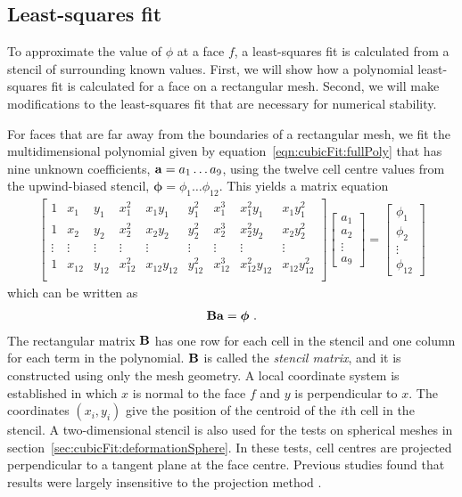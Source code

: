 \subsection{Least-squares fit}
To approximate the value of $\phi$ at a face $f$, a least-squares fit is calculated from a stencil of surrounding known values.  First, we will show how a polynomial least-squares fit is calculated for a face on a rectangular mesh.  Second, we will make modifications to the least-squares fit that are necessary for numerical stability.  

For faces that are far away from the boundaries of a rectangular mesh, we fit the multidimensional polynomial given by equation~\eqref{eqn:cubicFit:fullPoly} that has nine unknown coefficients, $\mathbf{a} = a_1 \ldots a_9$, using the twelve cell centre values from the upwind-biased stencil, $\bm{\phi} = \phi_1 \ldots \phi_{12}$.  This yields a matrix equation
\begin{align}
	\begin{bmatrix}
		1 & x_1 & y_1 & x_1^2 & x_1 y_1 & y_1^2 & x_1^3 & x_1^2 y_1 & x_1 y_1^2 \\
		1 & x_2 & y_2 & x_2^2 & x_2 y_2 & y_2^2 & x_2^3 & x_2^2 y_2 & x_2 y_2^2 \\
		\vdots & \vdots & \vdots & \vdots & \vdots & \vdots & \vdots & \vdots & \vdots \\
		1 & x_{12} & y_{12} & x_{12}^2 & x_{12} y_{12} & y_{12}^2 & x_{12}^3 & x_{12}^2 y_{12} & x_{12} y_{12}^2 \\
	\end{bmatrix}
	\begin{bmatrix}
		a_1 \\
		a_2 \\
		\vdots \\
		a_9
	\end{bmatrix}
	=
	\begin{bmatrix}
		\phi_1 \\
		\phi_2 \\
		\vdots \\
		\phi_{12}
	\end{bmatrix}
\end{align}
which can be written as
\begin{align}
	\mathbf{B} \mathbf{a} = \bm{\phi} \label{eqn:cubicFit:unweightedLeastSquares} \text{ .}
\end{align}
The rectangular matrix $\mathbf{B}$ has one row for each cell in the stencil and one column for each term in the polynomial.  $\mathbf{B}$ is called the \textit{stencil matrix}, and it is constructed using only the mesh geometry.
A local coordinate system is established in which $x$ is normal to the face $f$ and $y$ is perpendicular to $x$.
The coordinates $(x_i, y_i)$ give the position of the centroid of the $i$th cell in the stencil.
A two-dimensional stencil is also used for the tests on spherical meshes in section~\ref{sec:cubicFit:deformationSphere}.  In these tests, cell centres are projected perpendicular to a tangent plane at the face centre.  Previous studies found that results were largely insensitive to the projection method \citep{skamarock-gassmann2011,lashley2002}.

